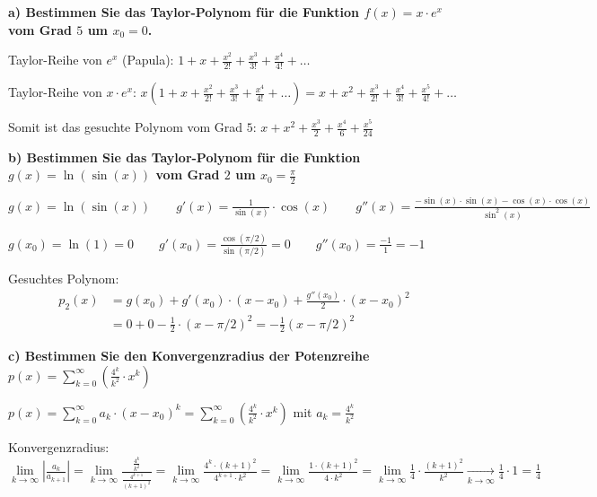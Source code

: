 
\textbf{a) Bestimmen Sie das Taylor-Polynom für die Funktion $f(x) = x \cdot e^x$ vom Grad $5$ um $x_0 = 0$.}

Taylor-Reihe von $e^x$ (Papula): $\displaystyle 1 + x + \frac{x^2}{2!} + \frac{x^3}{3!} + \frac{x^4}{4!} + \dots$

Taylor-Reihe von $x \cdot e^x$: $\displaystyle x \left( 1 + x + \frac{x^2}{2!} + \frac{x^3}{3!} + \frac{x^4}{4!} + \dots \right) = x + x^2 + \frac{x^3}{2!} + \frac{x^4}{3!} + \frac{x^5}{4!} + \dots$

Somit ist das gesuchte Polynom vom Grad $5$: $x + x^2 + \frac{x^3}{2} + \frac{x^4}{6} + \frac{x^5}{24}$

\textbf{b) Bestimmen Sie das Taylor-Polynom für die Funktion $g(x) = \ln(\sin(x))$ vom Grad $2$ um $x_0 = \frac{\pi}{2}$}

$\displaystyle g(x) = \ln(\sin(x)) \quad\quad g'(x) = \frac{1}{\sin(x)} \cdot \cos(x) \quad\quad g''(x) = \frac{-\sin(x) \cdot \sin(x) - \cos(x) \cdot \cos(x)}{\sin^2(x)}$

$\displaystyle g(x_0) = \ln(1) = 0 \quad\quad g'(x_0) = \frac{\cos(\pi / 2)}{\sin(\pi / 2)} = 0 \quad\quad g''(x_0) = \frac{-1}{1} = -1$

Gesuchtes Polynom:
\begin{align*}
    p_2(x) &= g(x_0) + g'(x_0) \cdot (x - x_0) + \frac{g''(x_0)}{2} \cdot (x - x_0)^2 \\
    &= 0 + 0 - \frac{1}{2} \cdot (x - \pi/2)^2 = -\frac{1}{2} (x - \pi/2)^2
\end{align*}

\textbf{c) Bestimmen Sie den Konvergenzradius der Potenzreihe $\displaystyle p(x) = \sum \limits_{k=0}^{\infty} \left( \frac{4^k}{k^2} \cdot x^k \right)$}

$\displaystyle p(x) = \sum \limits_{k=0}^{\infty} a_k \cdot (x - x_0)^k = \sum \limits_{k=0}^{\infty} \left( \frac{4^k}{k^2} \cdot x^k \right)$ mit $a_k = \frac{4^k}{k^2}$

Konvergenzradius:
$\displaystyle \lim \limits_{k \to \infty} \left| \frac{a_k}{a_{k+1}} \right| = \lim \limits_{k \to \infty} \frac{\frac{4^k}{k^2}}{\frac{4^{k+1}}{(k+1)^2}} = \lim \limits_{k \to \infty} \frac{4^k \cdot (k+1)^2}{4^{k+1} \cdot k^2} = \lim \limits_{k \to \infty} \frac{1 \cdot (k + 1)^2}{4 \cdot k^2} = \lim \limits_{k \to \infty} \frac{1}{4} \cdot \frac{(k+1)^2}{k^2} \xrightarrow[k \to \infty]{} \frac{1}{4} \cdot 1 = \frac{1}{4}$


